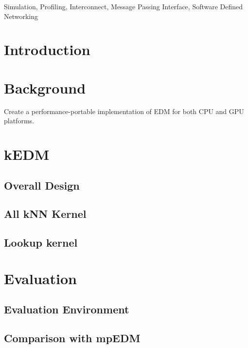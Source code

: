 \documentclass[conference]{IEEEtran}
\begin{document}
\begin{IEEEkeywords}
    Simulation, Profiling, Interconnect, Message Passing Interface, Software
    Defined Networking
\end{IEEEkeywords}

\section{Introduction}

\section{Background}

Create a performance-portable implementation of EDM for both CPU and GPU
platforms.

\section{kEDM}

\subsection{Overall Design}

\subsection{All kNN Kernel}

\subsection{Lookup kernel}

\section{Evaluation}

\subsection{Evaluation Environment}

\subsection{Comparison with mpEDM}
\end{document}
